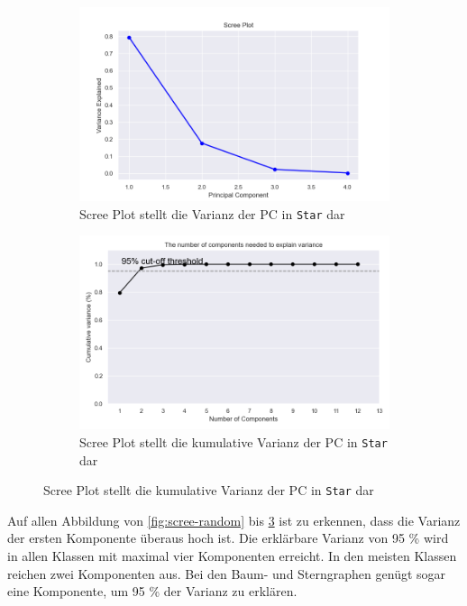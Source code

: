 \begin{figure}
    \begin{subfigure}{.5\textwidth}
        \includegraphics[width=\textwidth]{images/30_results/star-scree.png}
        \caption{Scree Plot stellt die Varianz der PC in \texttt{Star} dar}
        \label{fig:star-line}
    \end{subfigure}%
    \begin{subfigure}{.5\textwidth}
        \includegraphics[width=\textwidth]{images/30_results/star-scree-cum.png}
        \caption{Scree Plot stellt die kumulative Varianz der PC in \texttt{Star} dar}
        \label{fig:scree-cum-star}
    \end{subfigure}
\end{figure}

Auf allen Abbildung von \ref{fig:scree-random} bis \ref{fig:scree-cum-star} ist zu erkennen, dass die Varianz der ersten Komponente überaus hoch ist. Die erklärbare Varianz von 95 \% wird in allen Klassen mit maximal vier Komponenten erreicht. In den meisten Klassen reichen zwei Komponenten aus.
Bei den Baum- und Sterngraphen genügt sogar eine Komponente, um 95 \% der Varianz zu erklären.

